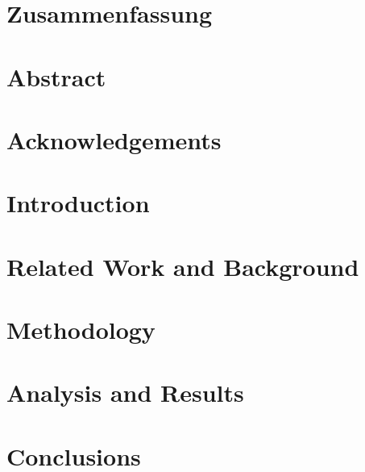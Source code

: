 \documentclass[12pt]{report}
\begin{document}

\chapter*{Zusammenfassung}
    

\chapter*{Abstract}
    

    
\chapter*{Acknowledgements}
    


\tableofcontents

    


\chapter{Introduction}
    

    
\chapter{Related Work and Background}
    
    
    
\chapter{Methodology}
    
    

\chapter{Analysis and Results}
    
    
    
\chapter{Conclusions}
    


\appendix
    
    
    
\printbibliography %
    
\end{document}
